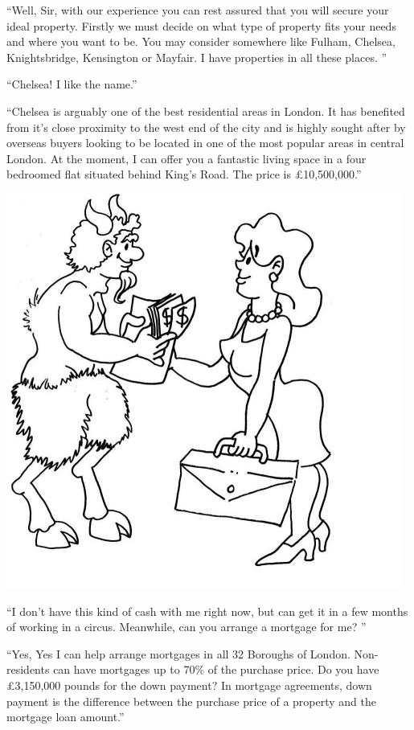 \documentclass[a4paper,12pt]{book}
\begin{document}
“Well, Sir, with our experience you can rest
assured that you will secure your ideal property.
Firstly we must decide on what type of property
fits your needs and where you want to be. You
may consider somewhere like Fulham, Chelsea,
Knightsbridge, Kensington or Mayfair.
I have properties in all these places. ”

“Chelsea! I like the name.”

“Chelsea is arguably one of the best residential
areas in London. It has benefited from it’s close
proximity to the west end of the city and is highly
sought after by overseas buyers looking to be located
in one of the most popular areas in central London.
At the moment, I can offer you a fantastic living
space in a four bedroomed flat situated behind
King's Road. The price is £10,500,000.”

\includegraphics[scale=0.5]{figs-prefix/greatgodpan.jpg}

“I don't have this kind of cash with me right now,
but can get it in a few months of working in a
circus. Meanwhile, can you arrange a mortgage for me? ”

“Yes, Yes I can help arrange mortgages in all 32 Boroughs
of London. Non-residents can have mortgages up to 70\% of
the purchase price. Do you have £3,150,000 pounds for the
down payment? In mortgage agreements, down payment is
the difference between the purchase price of a property
and the mortgage loan amount.”
\end{document}
